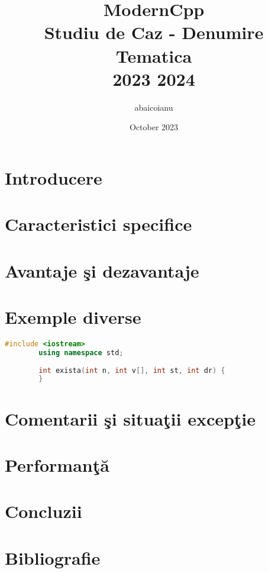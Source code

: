 \documentclass{article}
\title{ModernCpp \\ Studiu de Caz - Denumire Tematica\\ 2023 2024}
\author{abaicoianu }
\date{October 2023}
\begin{document}
	
	\maketitle
	
	\section{Introducere}
	\section{Caracteristici specifice}
	\section{Avantaje \c si dezavantaje}
	\section{Exemple diverse}
	\begin{lstlisting}[language=C++, caption={Exemplu de adăugare de cod}, label={basic_label}, breaklines=true, postbreak=\mbox{\textcolor{red}{$\hookrightarrow$}\space}]
		#include <iostream>
		using namespace std;
		
		int exista(int n, int v[], int st, int dr) {
		}
	\end{lstlisting}
	\section{Comentarii \c si situa\c tii excep\c tie}
	\section{Performan\c t\u a}
	\section{Concluzii}
	\section{Bibliografie}
\end{document}
